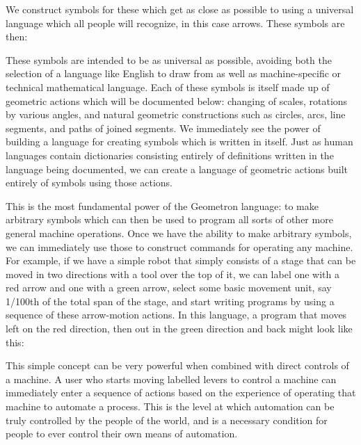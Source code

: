 We construct symbols for these which get as close as possible to using a
universal language which all people will recognize, in this case arrows.
These symbols are then:


These symbols are intended to be as universal as possible, avoiding both
the selection of a language like English to draw from as well as
machine-specific or technical mathematical language. Each of these
symbols is itself made up of geometric actions which will be documented
below: changing of scales, rotations by various angles, and natural
geometric constructions such as circles, arcs, line segments, and paths
of joined segments. We immediately see the power of building a language
for creating symbols which is written in itself. Just as human languages
contain dictionaries consisting entirely of definitions written in the
language being documented, we can create a language of geometric actions
built entirely of symbols using those actions.

This is the most fundamental power of the Geometron language: to make
arbitrary symbols which can then be used to program all sorts of other
more general machine operations. Once we have the ability to make
arbitrary symbols, we can immediately use those to construct commands
for operating any machine. For example, if we have a simple robot that
simply consists of a stage that can be moved in two directions with a
tool over the top of it, we can label one with a red arrow and one with
a green arrow, select some basic movement unit, say 1/100th of the total
span of the stage, and start writing programs by using a sequence of
these arrow-motion actions. In this language, a program that moves left
on the red direction, then out in the green direction and back might
look like this:


This simple concept can be very powerful when combined with direct
controls of a machine. A user who starts moving labelled levers to
control a machine can immediately enter a sequence of actions based on
the experience of operating that machine to automate a process. This is
the level at which automation can be truly controlled by the people of
the world, and is a necessary condition for people to ever control their
own means of automation.

